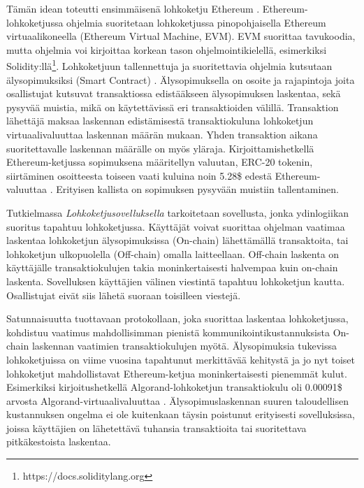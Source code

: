 Tämän idean toteutti ensimmäisenä lohkoketju Ethereum \cite{buterin_ethereum_2014}. Ethereum-lohkoketjussa ohjelmia suoritetaan lohkoketjussa pinopohjaisella Ethereum virtuaalikoneella (Ethereum Virtual Machine, EVM). EVM suorittaa tavukoodia, mutta ohjelmia voi kirjoittaa korkean tason ohjelmointikielellä, esimerkiksi Solidity:llä\footnote{https://docs.soliditylang.org}. Lohkoketjuun tallennettuja ja suoritettavia ohjelmia kutsutaan älysopimuksiksi (Smart Contract) \cite{buterin_ethereum_2014}.  Älysopimuksella on osoite ja rajapintoja joita osallistujat kutsuvat transaktiossa edistääkseen älysopimuksen laskentaa, sekä pysyvää muistia, mikä on käytettävissä eri transaktioiden välillä. Transaktion lähettäjä maksaa laskennan edistämisestä transaktiokuluna lohkoketjun virtuaalivaluuttaa laskennan määrän mukaan. Yhden transaktion aikana suoritettavalle laskennan määrälle on myös yläraja. Kirjoittamishetkellä Ethereum-ketjussa sopimuksena määritellyn valuutan, ERC-20 tokenin, siirtäminen osoitteesta toiseen vaati kuluina noin 5.28\$ edestä Ethereum-valuuttaa \cite{etherscanio_ethereum_nodate}. Erityisen kallista on sopimuksen pysyvään muistiin tallentaminen.

Tutkielmassa \textit{Lohkoketjusovelluksella} tarkoitetaan sovellusta, jonka ydinlogiikan suoritus tapahtuu lohkoketjussa. Käyttäjät voivat suorittaa ohjelman vaatimaa laskentaa lohkoketjun älysopimuksissa (On-chain) lähettämällä transaktoita, tai lohkoketjun ulkopuolella (Off-chain) omalla laitteellaan. Off-chain laskenta on käyttäjälle transaktiokulujen takia moninkertaisesti halvempaa kuin on-chain laskenta. Sovelluksen käyttäjien välinen viestintä tapahtuu lohkoketjun kautta. Osallistujat eivät siis lähetä suoraan toisilleen viestejä.

Satunnaisuutta tuottavaan protokollaan, joka suorittaa laskentaa lohkoketjussa, kohdistuu vaatimus mahdollisimman pienistä kommunikointikustannuksista On-chain laskennan vaatimien transaktiokulujen myötä. Älysopimuksia tukevissa lohkoketjuissa on viime vuosina tapahtunut merkittävää kehitystä ja jo nyt toiset lohkoketjut mahdollistavat Ethereum-ketjua moninkertaisesti pienemmät kulut. Esimerkiksi kirjoitushetkellä Algorand-lohkoketjun transaktiokulu oli 0.00091\$ arvosta Algorand-virtuaalivaluuttaa \cite{noauthor_algorand_nodate}. Älysopimuslaskennan suuren taloudellisen kustannuksen ongelma ei ole kuitenkaan täysin poistunut erityisesti sovelluksissa, joissa käyttäjien on lähetettävä tuhansia transaktioita tai suoritettava pitkäkestoista laskentaa.

